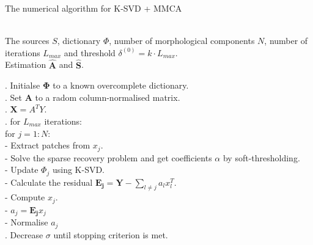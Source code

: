 \begin{algorithm}[!htbp] 
\caption{The numerical algorithm for K-SVD + MMCA} 
\label{alg:Framwork} 
\begin{algorithmic}
\REQUIRE ~~\\%
The sources $S$, dictionary $\Phi$, number of morphological components $N$, number of iterations $L_{max}$ and threshold $\delta^{(0)} = k \cdot L_{max}$.
\ENSURE ~~\\ %
Estimation $\hat{\mathbf{A}}$ and $\hat{\mathbf{S}}$.

. Initialse $\mathbf{\Phi}$ to a known overcomplete dictionary.\\
. Set $\mathbf{A}$ to a radom column-normalised matrix.\\
. $\mathbf{X} = A^T Y$.\\

. for $L_{max}$ iterations:\\
\quad \quad for $j = 1:N$:\\
\quad \quad \quad - Extract patches from $x_j$.\\
\quad \quad \quad - Solve the sparse recovery problem and get coefficients $\alpha$ by soft-thresholding.\\
\quad \quad \quad - Update $\Phi_j$ using K-SVD.\\
\quad \quad \quad - Calculate the residual $\mathbf{E_j} = \mathbf{Y} - \sum_{l\neq j}a_lx_l^T$. \\
\quad \quad \quad - Compute $x_j$. \\
\quad \quad \quad - $a_j = \mathbf{E_j}x_j$ \\
\quad \quad \quad - Normalise $a_j$  \\
. Decrease $\sigma$ until stopping criterion is met. \\
\end{algorithmic}
\end{algorithm}


